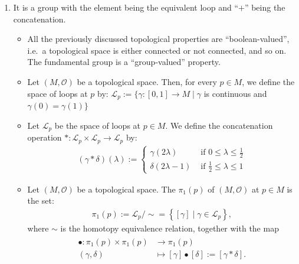 \documentclass{article}
\begin{document}
\begin{enumerate}
\begin{figure}[h!]
\end{figure}
\item {} It is a group with the element being the equivalent loop and ``$+$'' being the concatenation.
\begin{itemize}
\item All the previously discussed topological properties are ``boolean-valued'', i.e.\ a topological space is either connected or not connected, and so on. The fundamental group is a ``group-valued'' property.
    \item {}  Let $(M, \mathcal{O})$ be a topological space. Then, for every $p \in M$, we define the space of loops at $p$ by:
$\mathscr{L}_{p}:=\{\gamma:[0,1] \rightarrow M \mid \gamma$ is continuous and $\gamma(0)=\gamma(1)\}$
\item {} Let $\mathscr{L}_{p}$ be the space of loops at $p \in M$. We define the concatenation operation $*: \mathscr{L}_{p} \times \mathscr{L}_{p} \rightarrow \mathscr{L}_{p}$ by:
\begin{align*}
(\gamma * \delta)(\lambda):= \begin{cases}\gamma(2 \lambda) & \text { if } 0 \leq \lambda \leq \frac{1}{2} \\ \delta(2 \lambda-1) & \text { if } \frac{1}{2} \leq \lambda \leq 1\end{cases}
\end{align*}
\item Let $(M, \mathcal{O})$ be a topological space. The  $\pi_{1}(p)$ of $(M, \mathcal{O})$ at $p \in M$ is the set:
\begin{align*}
\pi_{1}(p):=\mathscr{L}_{p} / \sim=\left\{[\gamma] \mid \gamma \in \mathscr{L}_{p}\right\},
\end{align*}
where $\sim$ is the homotopy equivalence relation, together with the map
\begin{align*}
\begin{aligned}
\bullet: \pi_{1}(p) \times \pi_{1}(p) & \rightarrow \pi_{1}(p) \\
(\gamma, \delta) & \mapsto[\gamma] \bullet[\delta]:=[\gamma * \delta] .

\end{aligned}
\end{align*}
\end{itemize}
\end{enumerate}
\end{document}
